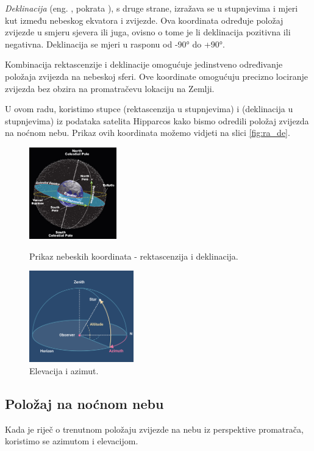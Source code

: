 \emph{Deklinacija} (eng. , pokrata ), s druge strane, izražava se u stupnjevima i mjeri kut između nebeskog ekvatora i zvijezde. Ova koordinata određuje položaj zvijezde u smjeru sjevera ili juga, ovisno o tome je li deklinacija pozitivna ili negativna. Deklinacija se mjeri u rasponu od -90° do +90°.

Kombinacija rektascenzije i deklinacije omogućuje jedinstveno određivanje položaja zvijezda na nebeskoj sferi. Ove koordinate omogućuju precizno lociranje zvijezda bez obzira na promatračevu lokaciju na Zemlji.

U ovom radu, koristimo stupce  (rektascenzija u stupnjevima) i  (deklinacija u stupnjevima) iz podataka satelita Hipparcos kako bismo odredili položaj zvijezda na noćnom nebu. Prikaz ovih koordinata možemo vidjeti na slici \ref{fig:ra_de}.

\begin{figure}[h]
  \begin{minipage}[t]{0.40\linewidth}
    \centering
    \includegraphics[height=150px]{assets/ext-ra_de.jpg}
    \caption{Prikaz nebeskih koordinata - rektascenzija i deklinacija. \cite{ct:ra_de-img}}\label{fig:ra_de}
  \end{minipage}
  \begin{minipage}[t]{0.55\linewidth}
    \centering
    \includegraphics[height=150px]{assets/ext_el-as.png}
    \caption{Elevacija i azimut. \cite{ct:el_as-img}}\label{fig:el_as}
  \end{minipage}
\end{figure}

\subsection{Položaj na noćnom nebu}
Kada je riječ o trenutnom položaju zvijezde na nebu iz perspektive promatrača, koristimo se azimutom i elevacijom.

